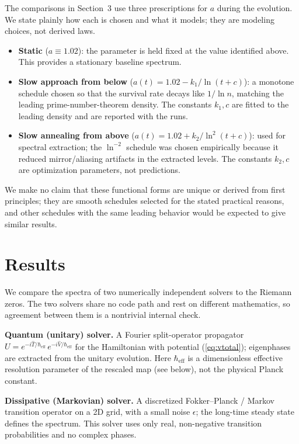 \documentclass[utf8]{FrontiersinHarvard}
\begin{document}
The comparisons in Section~3 use three prescriptions for $a$ during the evolution. We state plainly how each is chosen and what it models; they are modeling choices, not derived laws.
\begin{itemize}
\item \textbf{Static} ($a \equiv 1.02$): the parameter is held fixed at the value identified above. This provides a stationary baseline spectrum.
\item \textbf{Slow approach from below} ($a(t) = 1.02 - k_1/\ln(t+c)$): a monotone schedule chosen so that the survival rate decays like $1/\ln n$, matching the leading prime-number-theorem density. The constants $k_1, c$ are fitted to the leading density and are reported with the runs.
\item \textbf{Slow annealing from above} ($a(t) = 1.02 + k_2/\ln^2(t+c)$): used for spectral extraction; the $\ln^{-2}$ schedule was chosen empirically because it reduced mirror/aliasing artifacts in the extracted levels. The constants $k_2, c$ are optimization parameters, not predictions.
\end{itemize}
We make no claim that these functional forms are unique or derived from first principles; they are smooth schedules selected for the stated practical reasons, and other schedules with the same leading behavior would be expected to give similar results.

\section{Results}

We compare the spectra of two numerically independent solvers to the Riemann zeros. The two solvers share no code path and rest on different mathematics, so agreement between them is a nontrivial internal check.

\textbf{Quantum (unitary) solver.} A Fourier split-operator propagator $U = e^{-i\widehat{T}/\hbar_{\mathrm{eff}}}\,e^{-i\widehat{V}/\hbar_{\mathrm{eff}}}$ for the Hamiltonian with potential (\ref{eq:vtotal}); eigenphases are extracted from the unitary evolution. Here $\hbar_{\mathrm{eff}}$ is a dimensionless effective resolution parameter of the rescaled map (see below), not the physical Planck constant.

\textbf{Dissipative (Markovian) solver.} A discretized Fokker--Planck / Markov transition operator on a 2D grid, with a small noise $\epsilon$; the long-time steady state defines the spectrum. This solver uses only real, non-negative transition probabilities and no complex phases.
\end{document}
